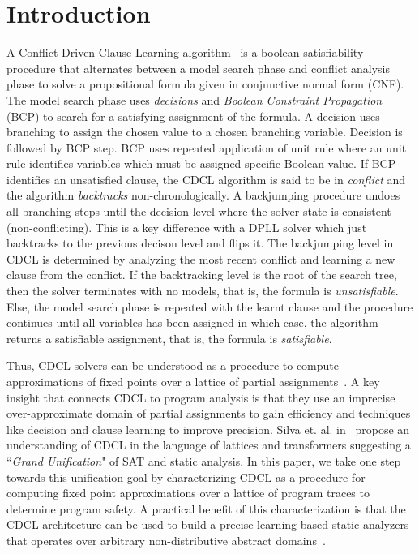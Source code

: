 \section{Introduction}

%
A Conflict Driven Clause Learning algorithm~\cite{cdcl} is a boolean satisfiability
procedure that alternates between a model search phase and conflict analysis
phase to solve a propositional formula given in conjunctive normal form (CNF).  
The model search phase uses \emph{decisions} and \emph{Boolean Constraint
Propagation} (BCP) to search for a satisfying assignment of the formula.  A 
decision uses branching to assign the chosen value to a chosen branching variable.  
Decision is followed by BCP step. BCP uses repeated application of unit rule where 
an unit rule identifies variables which must be assigned specific Boolean value. 
If BCP identifies an unsatisfied clause, the CDCL algorithm is said to be in 
\emph{conflict} and the algorithm \emph{backtracks} non-chronologically. A
backjumping procedure undoes all branching steps until the decision level 
where the solver state is consistent (non-conflicting).  This is a key 
difference with a DPLL solver which just backtracks to the previous 
decison level and flips it. The backjumping level in CDCL is determined 
by analyzing the most recent conflict and learning a new clause from the 
conflict.  If the backtracking level is the root of the search tree, then 
the solver terminates with no models, that is, the formula is \emph{unsatisfiable}.  
Else, the model search phase is repeated with the learnt clause and the procedure 
continues until all variables has been assigned in which case, the 
algorithm returns a satisfiable assignment, that is, the formula is \emph{satisfiable}. 
%

%
Thus, CDCL solvers can be understood as a procedure to compute approximations of fixed 
points over a lattice of partial assignments~\cite{sas12}.  A key insight 
that connects CDCL to program analysis is that they use an imprecise 
over-approximate domain of partial assignments to gain efficiency and 
techniques like decision and clause learning to improve precision.  
%
Silva et. al. in~\cite{popl2014} propose an understanding of CDCL in the language
of lattices and transformers suggesting a ``\emph{Grand Unification}" of SAT
and static analysis.
%
In this paper, we take one step towards this unification goal by characterizing CDCL
as a procedure for computing fixed point approximations over a lattice
of program traces to determine program safety.  
A practical benefit of this characterization is that the CDCL architecture can
be used to build a precise learning based static analyzers that operates over 
arbitrary non-distributive abstract domains~\cite{atva2017}.  \\
%


